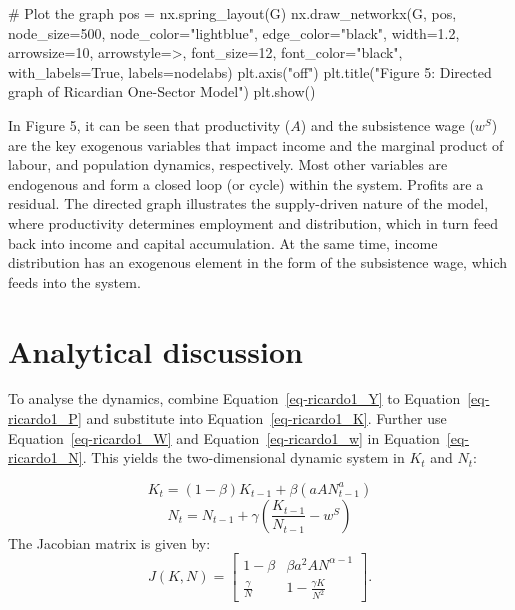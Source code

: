 \documentclass[
  letterpaper,
  DIV=11,
  numbers=noendperiod]{scrreprt}
\newenvironment{Shaded}{\begin{snugshade}}{\end{snugshade}}
\newcommand{\CommentTok}[1]{\textcolor[rgb]{0.37,0.37,0.37}{#1}}
\newcommand{\DecValTok}[1]{\textcolor[rgb]{0.68,0.00,0.00}{#1}}
\newcommand{\FloatTok}[1]{\textcolor[rgb]{0.68,0.00,0.00}{#1}}
\newcommand{\NormalTok}[1]{\textcolor[rgb]{0.00,0.23,0.31}{#1}}
\newcommand{\OperatorTok}[1]{\textcolor[rgb]{0.37,0.37,0.37}{#1}}
\newcommand{\StringTok}[1]{\textcolor[rgb]{0.13,0.47,0.30}{#1}}
\newcommand{\VariableTok}[1]{\textcolor[rgb]{0.07,0.07,0.07}{#1}}
\begin{document}
\begin{tcolorbox}
\begin{Shaded}
\begin{Highlighting}[]
\CommentTok{\# Plot the graph}
\NormalTok{pos }\OperatorTok{=}\NormalTok{ nx.spring\_layout(G)}
\NormalTok{nx.draw\_networkx(G, pos, node\_size}\OperatorTok{=}\DecValTok{500}\NormalTok{, node\_color}\OperatorTok{=}\StringTok{"lightblue"}\NormalTok{, }
\NormalTok{                 edge\_color}\OperatorTok{=}\StringTok{"black"}\NormalTok{, width}\OperatorTok{=}\FloatTok{1.2}\NormalTok{, arrowsize}\OperatorTok{=}\DecValTok{10}\NormalTok{, }
\NormalTok{                 arrowstyle}\OperatorTok{=}\StringTok{\textquotesingle{}{-}\textgreater{}\textquotesingle{}}\NormalTok{, font\_size}\OperatorTok{=}\DecValTok{12}\NormalTok{, font\_color}\OperatorTok{=}\StringTok{"black"}\NormalTok{,}
\NormalTok{                 with\_labels}\OperatorTok{=}\VariableTok{True}\NormalTok{, labels}\OperatorTok{=}\NormalTok{nodelabs)}
\NormalTok{plt.axis(}\StringTok{"off"}\NormalTok{)}
\NormalTok{plt.title(}\StringTok{"Figure 5: Directed graph of Ricardian One{-}Sector Model"}\NormalTok{)}
\NormalTok{plt.show()}
\end{Highlighting}
\end{Shaded}

\end{tcolorbox}

In Figure 5, it can be seen that productivity (\(A\)) and the
subsistence wage (\(w^S\)) are the key exogenous variables that impact
income and the marginal product of labour, and population dynamics,
respectively. Most other variables are endogenous and form a closed loop
(or cycle) within the system. Profits are a residual. The directed graph
illustrates the supply-driven nature of the model, where productivity
determines employment and distribution, which in turn feed back into
income and capital accumulation. At the same time, income distribution
has an exogenous element in the form of the subsistence wage, which
feeds into the system.

\section{Analytical discussion}\label{analytical-discussion-8}

To analyse the dynamics, combine Equation~\ref{eq-ricardo1_Y} to
Equation~\ref{eq-ricardo1_P} and substitute into
Equation~\ref{eq-ricardo1_K}. Further use Equation~\ref{eq-ricardo1_W}
and Equation~\ref{eq-ricardo1_w} in Equation~\ref{eq-ricardo1_N}. This
yields the two-dimensional dynamic system in \(K_t\) and \(N_t\):

\[
K_t = (1-\beta)K_{t-1}+\beta(aA N_{t-1}^a )
\] \[
N_t = N_{t-1} +\gamma\left(\frac{K_{t-1}}{N_{t-1}} -w^S\right) 
\] The Jacobian matrix is given by: \[
J(K, N)=\begin{bmatrix} 1-\beta& \beta a^2AN^{\alpha-1} \\\frac{\gamma}{N} & 1-\frac{\gamma K}{N^2} \end{bmatrix}.
\]
\end{document}
